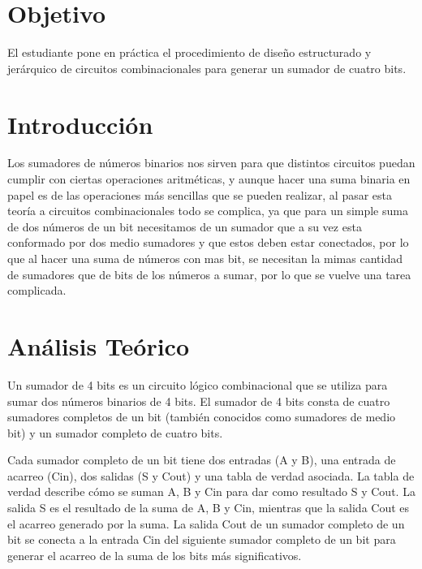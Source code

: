 \documentclass{article}
\begin{document}
\begin{abstract}
	\begin{justify}
		 \emph{Se logro el punto extra !}, en esta práctica se logro hacer un sumador de bits basico con capacidad de "carry in" y con un "carry out". 
		\end{justify}
{\it Keywords:}   diseño de hardware, sumador, bits
\end{abstract}
\begin{multicols}{2}
\section{Objetivo}\label{Objetivo}
El estudiante pone en práctica el procedimiento de diseño estructurado y 
jerárquico de circuitos combinacionales para generar un sumador de cuatro bits.
\section{Introducción}\label{sec:intro}
Los sumadores de números binarios nos sirven para que distintos circuitos puedan cumplir con ciertas operaciones aritméticas, y aunque hacer una suma binaria en papel es de las operaciones más sencillas que se pueden realizar, al pasar esta teoría a circuitos combinacionales todo se complica, ya que para un simple suma de dos números de un bit necesitamos de un sumador que a su vez esta conformado por dos medio sumadores y que estos deben estar conectados, por lo que al hacer una suma de números con mas bit, se necesitan la mimas cantidad de sumadores que de bits de los números a sumar, por lo que se vuelve una tarea complicada.
\section{Análisis Teórico}\label{sec:analiTeorico}
Un sumador de 4 bits es un circuito lógico combinacional que se utiliza para sumar dos números binarios de 4 bits. El sumador de 4 bits consta de cuatro sumadores completos de un bit (también conocidos como sumadores de medio bit) y un sumador completo de cuatro bits.

Cada sumador completo de un bit tiene dos entradas (A y B), una entrada de acarreo (Cin), dos salidas (S y Cout) y una tabla de verdad asociada. La tabla de verdad describe cómo se suman A, B y Cin para dar como resultado S y Cout. La salida S es el resultado de la suma de A, B y Cin, mientras que la salida Cout es el acarreo generado por la suma. La salida Cout de un sumador completo de un bit se conecta a la entrada Cin del siguiente sumador completo de un bit para generar el acarreo de la suma de los bits más significativos.


\end{multicols}
\end{document}
